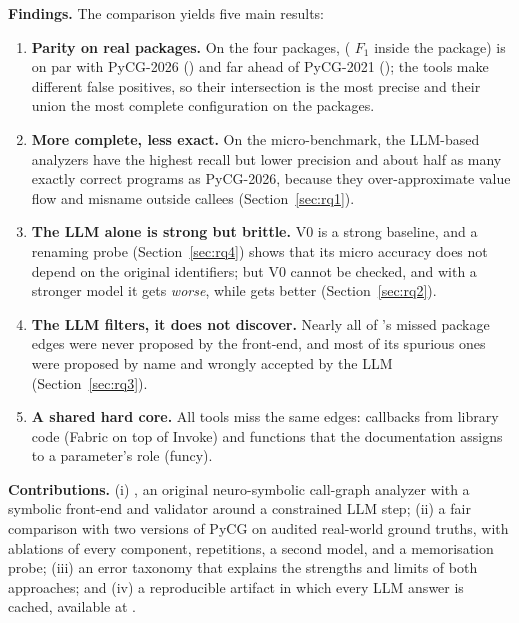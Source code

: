 \textbf{Findings.} The comparison yields five main results:
\begin{enumerate}[leftmargin=*,nosep]
\item \textbf{Parity on real packages.} On the four packages, \nscg
( $F_1$ inside the package) is on par with PyCG-2026
() and far ahead of PyCG-2021
(); the tools make different false positives, so
their intersection is the most precise and their union the most complete
configuration on the packages.
\item \textbf{More complete, less exact.} On the micro-benchmark, the LLM-based
analyzers have the highest recall but lower precision and about half as many
exactly correct programs as PyCG-2026, because they over-approximate value flow
and misname outside callees (Section~\ref{sec:rq1}).
\item \textbf{The LLM alone is strong but brittle.} V0 is a strong baseline, and
a renaming probe (Section~\ref{sec:rq4}) shows that its micro accuracy does not
depend on the original identifiers; but V0 cannot be checked, and with a
stronger model it gets \emph{worse}, while \nscg gets better (Section~\ref{sec:rq2}).
\item \textbf{The LLM filters, it does not discover.} Nearly all of \nscg's
missed package edges were never proposed by the front-end, and most of its
spurious ones were proposed by name and wrongly accepted by the LLM (Section~\ref{sec:rq3}).
\item \textbf{A shared hard core.} All tools miss the same edges: callbacks
from library code (Fabric on top of Invoke) and functions that the
documentation assigns to a parameter's role (funcy).
\end{enumerate}

\textbf{Contributions.} (i) \nscg, an original neuro-symbolic call-graph
analyzer with a symbolic front-end and validator around a constrained LLM step;
(ii) a fair comparison with two versions of PyCG on audited real-world ground
truths, with ablations of every component, repetitions, a second model, and a
memorisation probe; (iii) an error taxonomy that explains the strengths and
limits of both approaches; and (iv) a reproducible artifact in which every LLM
answer is cached, available at \repo.
